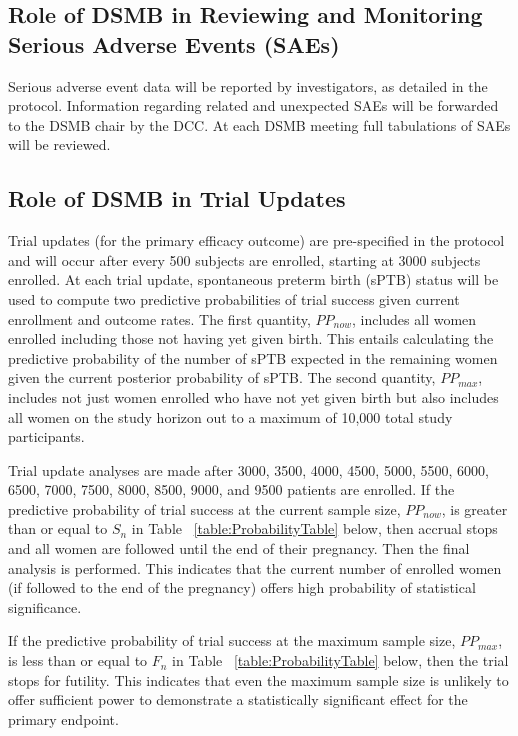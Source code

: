 \documentclass[12pt]{article}
\begin{document}
\subsection{Role of DSMB in Reviewing and Monitoring Serious Adverse Events (SAEs)}
Serious adverse event data will be reported by investigators, as detailed in 
the protocol. Information regarding related and unexpected SAEs will be 
forwarded to the DSMB chair by the DCC. At each DSMB meeting full 
tabulations of SAEs will be reviewed. 

\subsection{Role of DSMB in Trial Updates}
Trial updates (for the primary efficacy outcome) are pre-specified in the 
protocol and will occur after every 500 subjects are enrolled, starting at 
3000 subjects enrolled. At each trial update, spontaneous preterm birth 
(sPTB) status will be used to compute two predictive probabilities of trial 
success given current enrollment and outcome rates.  The first quantity, 
$PP_{now}$, includes all women enrolled including those not having yet given 
birth.  This entails calculating the predictive probability of the number of 
sPTB expected in the remaining women given the current posterior probability 
of sPTB. The second quantity, $PP_{max}$, includes not just women enrolled 
who have not yet given birth but also includes all women on the study 
horizon out to a maximum of 10,000 total study participants.

Trial update analyses are made after 3000, 3500, 4000, 4500, 5000, 5500, 
6000, 6500, 7000, 7500, 8000, 8500, 9000, and 9500 patients are enrolled.   
If the predictive probability of trial success at the current sample size, 
$PP_{now}$, is greater than or equal to $S_n$ in Table~
\ref{table:ProbabilityTable} below, then accrual stops and all women are 
followed until the end of their pregnancy.  Then the final analysis is 
performed.  This indicates that the current number of enrolled women (if 
followed to the end of the pregnancy) offers high probability of statistical 
significance.

If the predictive probability of trial success at the maximum sample size, 
$PP_{max}$, is less than or equal to $F_n$ in Table~
\ref{table:ProbabilityTable} below, then the trial stops for futility.  This 
indicates that even the maximum sample size is unlikely to offer sufficient 
power to demonstrate a statistically significant effect for the primary 
endpoint. 
\end{document}
